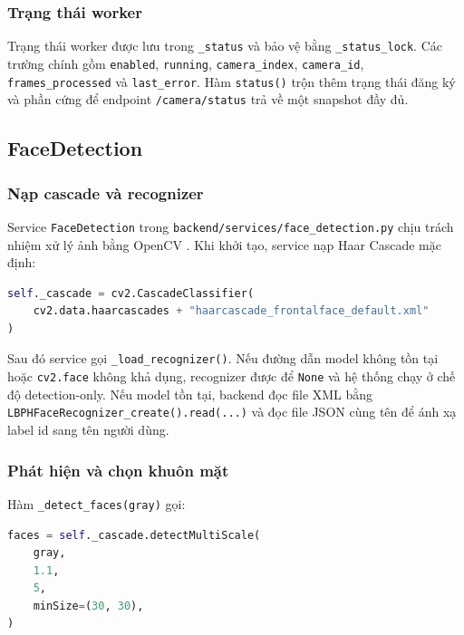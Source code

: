 \subsubsection{Trạng thái worker}

Trạng thái worker được lưu trong \texttt{\_status} và bảo vệ bằng \texttt{\_status\_lock}. Các trường chính gồm \texttt{enabled}, \texttt{running}, \texttt{camera\_index}, \texttt{camera\_id}, \texttt{frames\_processed} và \texttt{last\_error}. Hàm \texttt{status()} trộn thêm trạng thái đăng ký và phần cứng để endpoint \texttt{/camera/status} trả về một snapshot đầy đủ.

\subsection{FaceDetection}

\subsubsection{Nạp cascade và recognizer}

Service \texttt{FaceDetection} trong \texttt{backend/services/face\_detection.py} chịu trách nhiệm xử lý ảnh bằng OpenCV \cite{opencv}. Khi khởi tạo, service nạp Haar Cascade mặc định:

\begin{lstlisting}[language=Python, caption={Nạp Haar Cascade frontal face}]
self._cascade = cv2.CascadeClassifier(
    cv2.data.haarcascades + "haarcascade_frontalface_default.xml"
)
\end{lstlisting}

Sau đó service gọi \texttt{\_load\_recognizer()}. Nếu đường dẫn model không tồn tại hoặc \texttt{cv2.face} không khả dụng, recognizer được để \texttt{None} và hệ thống chạy ở chế độ detection-only. Nếu model tồn tại, backend đọc file XML bằng \texttt{LBPHFaceRecognizer\_create().read(...)} và đọc file JSON cùng tên để ánh xạ label id sang tên người dùng.

\subsubsection{Phát hiện và chọn khuôn mặt}

Hàm \texttt{\_detect\_faces(gray)} gọi:

\begin{lstlisting}[language=Python, caption={Tham số Haar Cascade trong FaceDetection}]
faces = self._cascade.detectMultiScale(
    gray,
    1.1,
    5,
    minSize=(30, 30),
)
\end{lstlisting}


